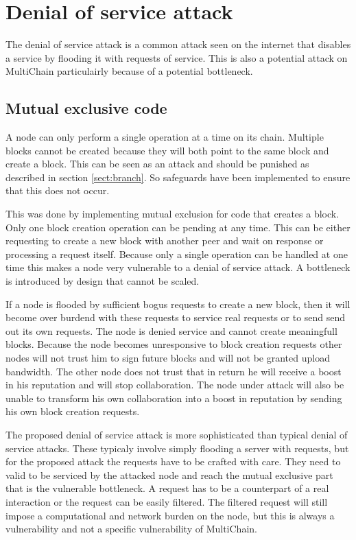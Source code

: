 \section{Denial of service attack}
The denial of service attack is a common attack seen on the internet
that disables a service by flooding it with requests of service.
This is also a potential attack on MultiChain particulairly because of a potential bottleneck.

\subsection{Mutual exclusive code}
A node can only perform a single operation at a time on its chain.
Multiple blocks cannot be created because they will both point to the same block and create a block.
This can be seen as an attack and should be punished as described in section \ref{sect:branch}.
So safeguards have been implemented to ensure that this does not occur.

This was done by implementing mutual exclusion for code that creates a block.
Only one block creation operation can be pending at any time.
This can be either requesting to create a new block with another peer and wait on response or
processing a request itself.
Because only a single operation can be handled at one time
this makes a node very vulnerable to a denial of service attack.
A bottleneck is introduced by design that cannot be scaled.

If a node is flooded by sufficient bogus requests to create a new block,
then it will become over burdend with these requests to service real requests or to send send out its own requests.
The node is denied service and cannot create meaningfull blocks.
Because the node becomes unresponsive to block creation requests other nodes will not trust him to sign future blocks
and will not be granted upload bandwidth.
The other node does not trust that in return he will receive a boost in his reputation and will stop collaboration.
The node under attack will also be unable to transform his own collaboration into a boost in reputation
by sending his own block creation requests.

The proposed denial of service attack is more sophisticated than typical denial of service attacks.
These typicaly involve simply flooding a server with requests,
but for the proposed attack the requests have to be crafted with care.
They need to valid to be serviced by the attacked node and reach the mutual exclusive part
that is the vulnerable bottleneck.
A request has to be a counterpart of a real interaction or the request can be easily filtered.
The filtered request will still impose a computational and network burden on the node,
but this is always a vulnerability and not a specific vulnerability of MultiChain.

